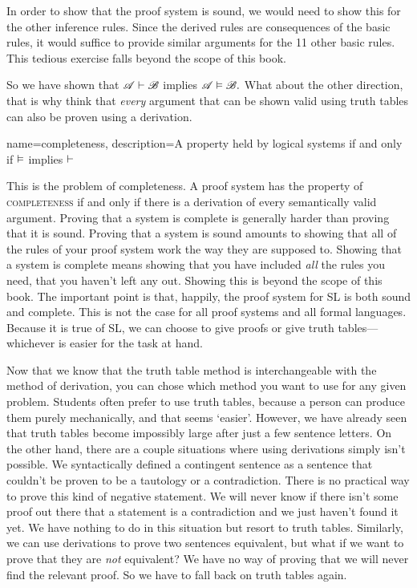 In order to show that the proof system is sound, we would need to show this for the other inference rules. Since the derived rules are consequences of the basic rules, it would suffice to provide similar arguments for the 11 other basic rules. This tedious exercise falls beyond the scope of this book.

So we have shown that $\mathscr{A} \vdash  \mathscr{B}$ implies $\mathscr{A} \vDash \mathscr{B}.$ What about the other direction, that is why think that \emph{every} argument that can be shown valid using truth tables can also be proven using a derivation. 

{
name=completeness,
description={A property held by logical systems if and only if $\vDash $ implies $\vdash $}
}

This is the problem of completeness. A proof system has the property of  \textsc{\gls{completeness}} \label{def:completeness} if and only if there is a derivation of every semantically valid argument. Proving that a system is complete is generally harder than proving that it is sound. Proving that a system is sound amounts to showing that all of the rules of your proof system work the way they are supposed to. Showing that a system is complete means showing that you have included \emph{all} the rules you need, that you haven't left any out. Showing this is beyond the scope of this book. The important point is that, happily, the proof system for SL is both sound and complete. This is not the case for all proof systems and all formal languages. Because it is true of SL, we can choose to give proofs or give truth tables---whichever is easier for the task at hand.

Now that we know that the truth table method is interchangeable with the method of derivation, you can chose which method you want to use for any given problem. Students often prefer to use truth tables, because a person can produce them purely mechanically, and that seems `easier'. However, we have already seen that truth tables become impossibly large after just a few sentence letters. On the other hand, there are a couple situations where using derivations simply isn't possible. We syntactically defined a contingent sentence as a sentence that couldn't be proven to be a tautology or a contradiction. There is no practical way to prove this kind of negative statement. We will never know if there isn't some proof out there that a statement is a contradiction and we just haven't found it yet. We have nothing to do in this situation but resort to truth tables. Similarly, we can use derivations to prove two sentences equivalent, but what if we want to prove that they are \emph{not} equivalent? We have no way of proving that we will never find the relevant proof. So we have to fall back on truth tables again.

